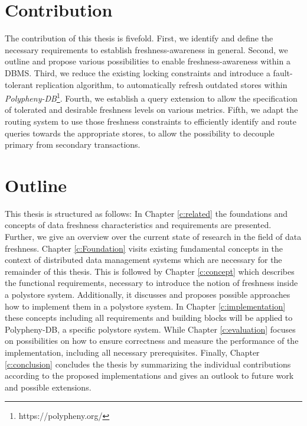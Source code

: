 
\section{Contribution}
The contribution of this thesis is fivefold. First, we identify and define the necessary requirements to establish freshness-awareness in general.
Second, we outline and propose various possibilities to enable freshness-awareness within a DBMS. Third, we reduce the existing locking constraints and 
introduce a fault-tolerant replication algorithm, to automatically refresh outdated stores within \emph{Polypheny-DB}\footnote{https://polypheny.org/}. 
Fourth, we establish a query extension to allow the specification of tolerated and desirable freshness levels 
on various metrics. Fifth, we adapt the routing system to use those freshness constraints to efficiently identify and route queries towards the appropriate stores, 
to allow the possibility to decouple primary from secondary transactions.




\section{Outline}
This thesis is structured as follows:
In Chapter \ref{c:related} the foundations and concepts of data freshness characteristics and requirements are presented.
Further, we give an overview over the current state of research in the field of data freshness. 
Chapter \ref{c:Foundation} visits existing fundamental concepts in the context of distributed data management systems 
which are necessary for the remainder of this thesis. 
This is followed by Chapter \ref{c:concept} which describes the functional requirements, necessary to introduce the notion of freshness inside a polystore system. 
Additionally, it discusses and proposes possible approaches how to implement them in a polystore system. 
In Chapter \ref{c:implementation} these concepts including all requirements and building blocks will be applied to Polypheny-DB, a specific polystore system.
While Chapter \ref{c:evaluation} focuses on possibilities on how to ensure correctness and measure the performance of the implementation, including all necessary prerequisites.
Finally, Chapter \ref{c:conclusion} concludes the thesis by summarizing the individual contributions according to the proposed
implementations and gives an outlook to future work and possible extensions.



